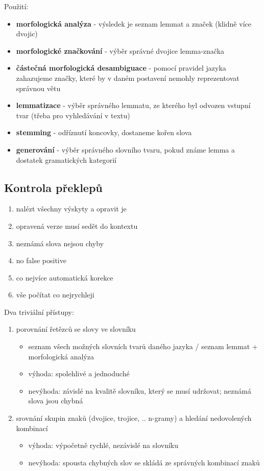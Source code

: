 \documentclass[a4paper]{article}
\newcommand{\imwc}[2]{\textbf{#1} - #2}
\begin{document}
Použití:
\begin{itemize}
\item \imwc{morfologická analýza}{výsledek je seznam lemmat a značek (klidně více dvojic)}
\item \imwc{morfologické značkování}{výběr správné dvojice lemma-značka}
\item \imwc{částečná morfologická desambiguace}{pomocí pravidel jazyka zahazujeme značky, které by v daném postavení nemohly reprezentovat správnou větu}
\item \imwc{lemmatizace}{výběr správného lemmatu, ze kterého byl odvozen vstupní tvar (třeba pro vyhledávání v textu)}
\item \imwc{stemming}{odříznutí koncovky, dostaneme kořen slova}
\item \imwc{generování}{výběr správného slovního tvaru, pokud známe lemma a dostatek gramatických kategorií}
\end{itemize}

\subsection*{Kontrola překlepů}
\begin{enumerate}
	\item nalézt všechny výskyty a opravit je
	\item opravená verze musí sedět do kontextu
	\item neznámá slova nejsou chyby
	\item no false positive
	\item co nejvíce automatická korekce
	\item vše počítat co nejrychleji
\end{enumerate}

Dva triviální přístupy:
\begin{enumerate}
\item porovnání řetězců se slovy ve slovníku 
	\begin{itemize}
	\item seznam všech možných slovních tvarů daného jazyka / seznam lemmat + morfologická analýza
	\item výhoda: spolehlivé a jednoduché
	\item nevýhoda: závislé na kvalitě slovníku, který se musí udržovat; neznámá slova jsou chybná
	\end{itemize}
\item srovnání skupin znaků (dvojice, trojice, .. n-gramy) a hledání nedovolených kombinací
	\begin{itemize}
	\item výhoda: výpočetně rychlé, nezávislé na slovníku
	\item nevýhoda: spousta chybných slov se skládá ze správných kombinací znaků
	\end{itemize}
\end{enumerate}
\end{document}
